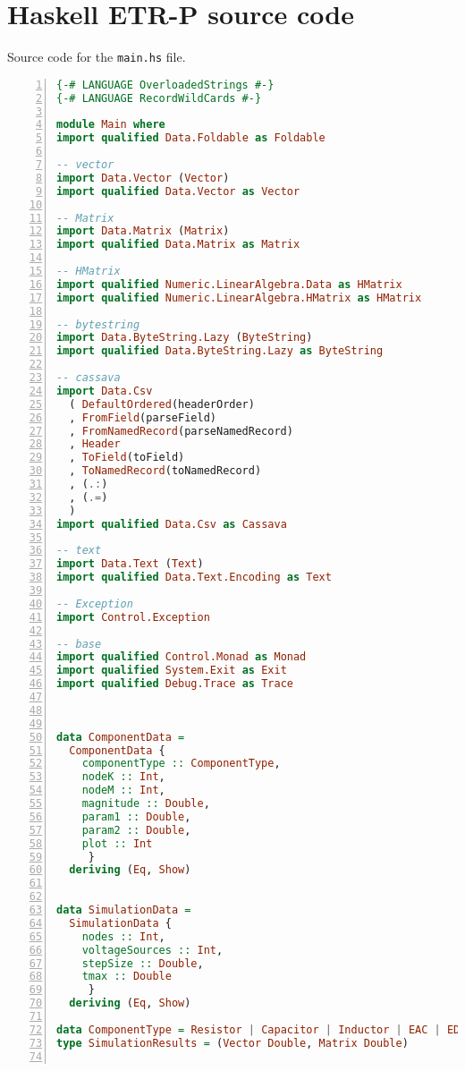 \chapter{Haskell ETR-P source code}
\label{apdx:code}

Source code for the \lstinline!main.hs! file.

\begin{lstlisting}[language=Haskell, numbers=left, caption={Main.hs file code}, captionpos=b, label={lst:maincompletecode}]
{-# LANGUAGE OverloadedStrings #-}
{-# LANGUAGE RecordWildCards #-}

module Main where
import qualified Data.Foldable as Foldable

-- vector
import Data.Vector (Vector)
import qualified Data.Vector as Vector

-- Matrix
import Data.Matrix (Matrix)
import qualified Data.Matrix as Matrix

-- HMatrix
import qualified Numeric.LinearAlgebra.Data as HMatrix
import qualified Numeric.LinearAlgebra.HMatrix as HMatrix

-- bytestring
import Data.ByteString.Lazy (ByteString)
import qualified Data.ByteString.Lazy as ByteString

-- cassava
import Data.Csv
  ( DefaultOrdered(headerOrder)
  , FromField(parseField)
  , FromNamedRecord(parseNamedRecord)
  , Header
  , ToField(toField)
  , ToNamedRecord(toNamedRecord)
  , (.:)
  , (.=)
  )
import qualified Data.Csv as Cassava

-- text
import Data.Text (Text)
import qualified Data.Text.Encoding as Text

-- Exception
import Control.Exception

-- base
import qualified Control.Monad as Monad
import qualified System.Exit as Exit
import qualified Debug.Trace as Trace



data ComponentData = 
  ComponentData { 
    componentType :: ComponentType,
    nodeK :: Int,
    nodeM :: Int,
    magnitude :: Double,
    param1 :: Double,
    param2 :: Double,
    plot :: Int
     }
  deriving (Eq, Show)


data SimulationData = 
  SimulationData { 
    nodes :: Int,
    voltageSources :: Int,
    stepSize :: Double,
    tmax :: Double
     }
  deriving (Eq, Show)

data ComponentType = Resistor | Capacitor | Inductor | EAC | EDC | Other Text deriving (Eq, Show)
type SimulationResults = (Vector Double, Matrix Double)


\end{lstlisting}
